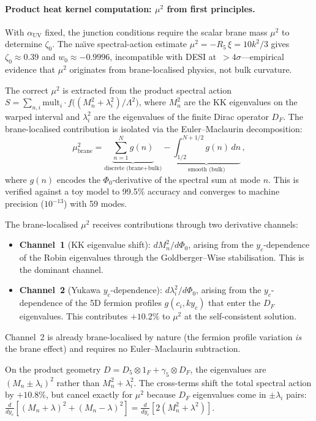 \paragraph{Product heat kernel computation: $\mu^2$ from first principles.}
\label{par:4-mu2-computation}
With $\alpha_{\mathrm{UV}}$ fixed, the junction conditions require the scalar brane mass $\mu^2$ to determine $\zeta_0$.  The na\"{\i}ve spectral-action estimate $\mu^2 = -R_5\, \xi = 10 k^2/3$ gives $\zeta_0 \approx 0.39$ and $w_0 \approx -0.9996$, incompatible with DESI at~$> 4\sigma$---empirical evidence that $\mu^2$ originates from brane-localised physics, not bulk curvature.

The correct $\mu^2$ is extracted from the product spectral action $S = \sum_{n,i} \mathrm{mult}_i \cdot f\!\bigl((M_n^2 + \lambda_i^2)/\Lambda^2\bigr)$, where $M_n^2$ are the KK eigenvalues on the warped interval and $\lambda_i^2$ are the eigenvalues of the finite Dirac operator $D_F$.  The brane-localised contribution is isolated via the Euler--Maclaurin decomposition:
\begin{equation}
  \mu^2_{\mathrm{brane}} = \underbrace{\sum_{n=1}^{N} g(n)}_{\text{discrete (brane+bulk)}} - \underbrace{\int_{1/2}^{N+1/2} g(n)\, dn}_{\text{smooth (bulk)}}\,,
  \label{eq:4-em-decomposition}
\end{equation}
where $g(n)$ encodes the $\Phi_0$-derivative of the spectral sum at mode $n$.  This is verified against a toy model to 99.5\% accuracy and converges to machine precision ($10^{-13}$) with 59 modes.

The brane-localised $\mu^2$ receives contributions through two derivative channels:
\begin{itemize}
  \item \textbf{Channel~1} (KK eigenvalue shift): $dM_n^2/d\Phi_0$, arising from the $y_c$-dependence of the Robin eigenvalues through the Goldberger--Wise stabilisation.  This is the dominant channel.
  \item \textbf{Channel~2} (Yukawa $y_c$-dependence): $d\lambda_i^2/d\Phi_0$, arising from the $y_c$-dependence of the 5D fermion profiles $g(c_i, ky_c)$ that enter the $D_F$ eigenvalues.  This contributes $+10.2\%$ to $\mu^2$ at the self-consistent solution.
\end{itemize}
Channel~2 is already brane-localised by nature (the fermion profile variation \emph{is} the brane effect) and requires no Euler--Maclaurin subtraction.

On the product geometry $D = D_5 \otimes 1_F + \gamma_5 \otimes D_F$, the eigenvalues are $(M_n \pm \lambda_i)^2$ rather than $M_n^2 + \lambda_i^2$.  The cross-terms shift the total spectral action by $+10.8\%$, but cancel exactly for $\mu^2$ because $D_F$ eigenvalues come in $\pm\lambda_i$ pairs: $\frac{d}{dy_c}[(M_n + \lambda)^2 + (M_n - \lambda)^2] = \frac{d}{dy_c}[2(M_n^2 + \lambda^2)]$.


